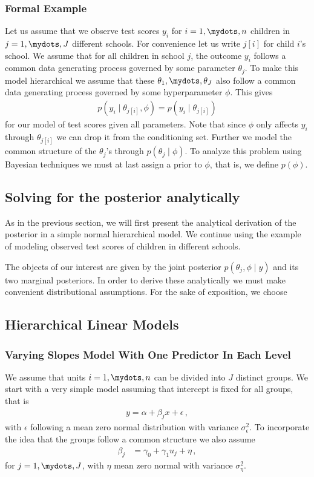 \newpage
\subsubsection*{Formal Example}
Let us assume that we observe test scores $y_i$ for $i = 1,\mydots,n$ children
in $j=1,\mydots,J$ different schools. For convenience let us write $j[i]$ for child
$i$'s school. We assume that for all children in school $j$, the outcome $y_i$
follows a common data generating process governed by some parameter $\theta_j$.
To make this model hierarchical we assume that these $\theta_1,\mydots,\theta_J$
also follow a common data generating process governed by some hyperparameter $\phi$.
This gives
\begin{align}
  p(y_i \mid \theta_{j[i]}, \phi) = p(y_i \mid \theta_{j[i]})
\end{align}
for our model of test scores given all parameters. Note that since $\phi$ only
affects $y_i$ through $\theta_{j[i]}$ we can drop it from the conditioning set.
Further we model the common structure of the $\theta_j$'s through $p(\theta_j \mid \phi)$.
To analyze this problem using Bayesian techniques we must at last assign a prior
to $\phi$, that is, we define $p(\phi)$.

\subsection{Solving for the posterior analytically}
As in the previous section, we will first present the analytical derivation of
the posterior in a simple normal hierarchical model. We continue using the
example of modeling observed test scores of children in different schools.

The objects of our interest are given by the joint posterior $p(\theta_j, \phi \mid y)$
and its two marginal posteriors. In order to derive these analytically we must
make convenient distributional assumptions. For the sake of exposition, we choose


\subsection{Hierarchical Linear Models}

\subsubsection{Varying Slopes Model With One Predictor In Each Level}
We assume that units $i = 1,\mydots,n$ can be divided into $J$ distinct groups.
We start with a very simple model assuming that intercept is fixed for all
groups, that is
\begin{align}
  y = \alpha + \beta_j x + \epsilon \,,
\end{align}
with $\epsilon$ following a mean zero normal distribution with variance
$\sigma_{\epsilon}^2$.
To incorporate the idea that the groups follow a common structure we also
assume
\begin{align}
  \beta_j &= \gamma_0 + \gamma_1 u_j + \eta \,,
\end{align}
for $j = 1,\mydots,J$, with $\eta$ mean zero normal with variance $\sigma_\eta^2$.

